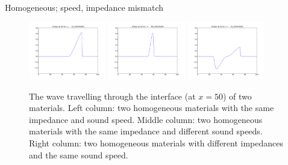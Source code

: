 \documentclass{beamer}
\begin{document}
\begin{frame}{Homogeneous; speed, impedance mismatch}
\begin{figure}
    \includegraphics[width=0.3\textwidth]{homo4.png}
  \includegraphics[width=0.3\textwidth]{sound4.png}
  \includegraphics[width=0.3\textwidth]{reflect4.png}
  \caption{The wave travelling through the interface (at $x=50$) of two materials. Left column: two homogeneous materials with the same impedance and sound speed. Middle column: two homogeneous materials with the same impedance and different sound speeds. Right column: two homogeneous materials with different impedances and the same sound speed.}
  \label{imp}
\end{figure}
\end{frame}
\end{document}
